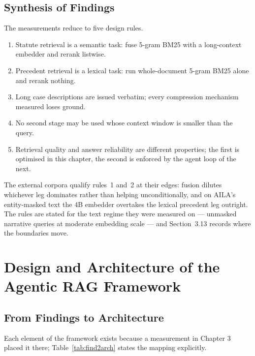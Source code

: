 \documentclass{mnnit}
\begin{document}
\section{Synthesis of Findings}
The measurements reduce to five design rules.
\begin{enumerate}
\item Statute retrieval is a semantic task: fuse 5-gram BM25 with
  a long-context embedder and rerank listwise.
\item Precedent retrieval is a lexical task: run whole-document
  5-gram BM25 alone and rerank nothing.
\item Long case descriptions are issued verbatim; every
  compression mechanism measured loses ground.
\item No second stage may be used whose context window is smaller
  than the query.
\item Retrieval quality and answer reliability are different
  properties; the first is optimised in this chapter, the second
  is enforced by the agent loop of the next.
\end{enumerate}
The external corpora qualify rules~1 and~2 at their edges:
fusion dilutes whichever leg dominates rather than helping
unconditionally, and on AILA's entity-masked text the 4B
embedder overtakes the lexical precedent leg outright. The
rules are stated for the text regime they were measured on ---
unmasked narrative queries at moderate embedding scale ---
and Section~3.13 records where the boundaries move.

\chapter{Design and Architecture of the Agentic RAG Framework}

\section{From Findings to Architecture}
Each element of the framework exists because a measurement in
Chapter 3 placed it there; Table~\ref{tab:find2arch} states the
mapping explicitly.
\end{document}
